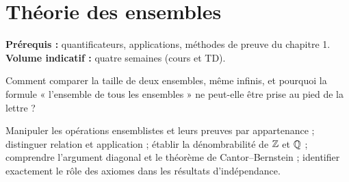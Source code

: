 \chapter{Théorie des ensembles}
\label{chap:ensembles}
\begin{flushleft}\small\sffamily
\textbf{Prérequis :} quantificateurs, applications, méthodes de preuve du chapitre 1.\qquad
\textbf{Volume indicatif :} quatre semaines (cours et TD).
\end{flushleft}
\begin{questionfondatrice}
Comment comparer la taille de deux ensembles, même infinis, et pourquoi la formule « l'ensemble de tous les ensembles » ne peut-elle être prise au pied de la lettre ?
\end{questionfondatrice}
\begin{objectifs}
Manipuler les opérations ensemblistes et leurs preuves par appartenance ; distinguer relation et application ; établir la dénombrabilité de $\mathbb Z$ et $\mathbb Q$ ; comprendre l'argument diagonal et le théorème de Cantor--Bernstein ; identifier exactement le rôle des axiomes dans les résultats d'indépendance.
\end{objectifs}

